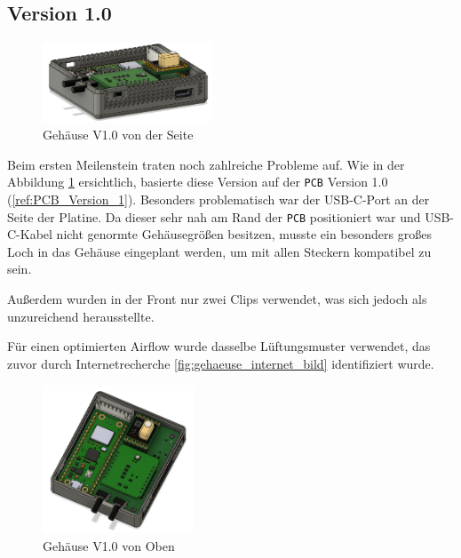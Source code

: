 \begin{inhalt}
\clearpage

\section{Version 1.0}
\label{ref:gehaeuse_1_0}

\begin{figure}[!htb]
\centering
\includegraphics[width=0.45\textwidth]{files/Thomas/pics/geheause/1.0/gehaeuse_side.png}
\caption[Bildbezeichnung für Abbildungsverzeichnis]{Gehäuse V1.0 von der Seite}
\label{fig:gehaeuse_side_v1_0}
\end{figure}

Beim ersten Meilenstein traten noch zahlreiche Probleme auf. Wie in der Abbildung \ref{fig:gehaeuse_side_v1_0} ersichtlich, basierte diese Version auf der \texttt{PCB} Version 1.0 (\ref{ref:PCB_Version_1}).  
Besonders problematisch war der USB-C-Port an der Seite der Platine. Da dieser sehr nah am Rand der \texttt{PCB} positioniert war und USB-C-Kabel nicht genormte Gehäusegrößen besitzen,  
musste ein besonders großes Loch in das Gehäuse eingeplant werden, um mit allen Steckern kompatibel zu sein.  

\vspace{0.15cm}

Außerdem wurden in der Front nur zwei Clips verwendet, was sich jedoch als unzureichend herausstellte.  


\vspace{0.15cm}

Für einen optimierten Airflow wurde dasselbe Lüftungsmuster verwendet, das zuvor durch Internetrecherche \ref{fig:gehaeuse_internet_bild} identifiziert wurde.



\begin{figure}[!htb]
\centering
\includegraphics[width=0.4\textwidth]{files/Thomas/pics/geheause/1.0/gehaeuse_top.png}
\caption[Bildbezeichnung für Abbildungsverzeichnis]{Gehäuse V1.0 von Oben}
\label{fig:gehaeuse_top_1_0}
\end{figure}



\end{inhalt}
